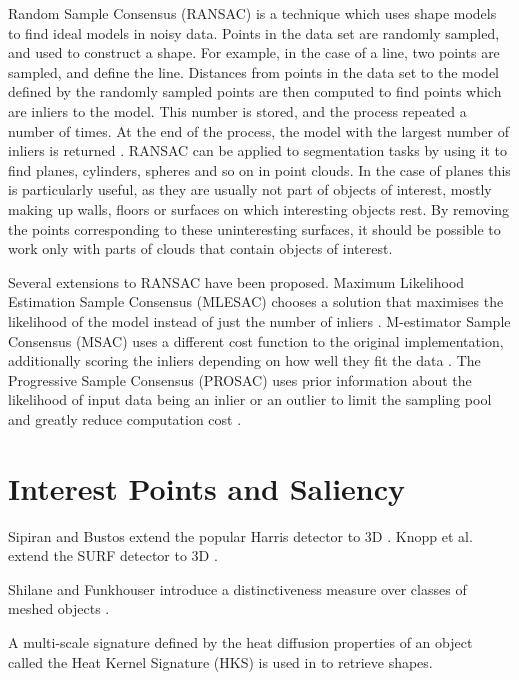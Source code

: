 \documentclass[11pt,a4paper]{kth-mag}
\begin{document}
Random Sample Consensus (RANSAC) is a technique which uses shape models to find
ideal models in noisy data. Points in the data set are randomly sampled, and
used to construct a shape. For example, in the case of a line, two points are
sampled, and define the line. Distances from points in the data set to the model
defined by the randomly sampled points are then computed to find points which
are inliers to the model. This number is stored, and the process repeated a
number of times. At the end of the process, the model with the largest number of
inliers is returned \cite{fischler1981random}. RANSAC can be applied to
segmentation tasks by using it to find planes, cylinders, spheres and so on in
point clouds. In the case of planes this is particularly useful, as they are
usually not part of objects of interest, mostly making up walls, floors or
surfaces on which interesting objects rest. By removing the points corresponding
to these uninteresting surfaces, it should be possible to work only with parts
of clouds that contain objects of interest.

Several extensions to RANSAC have been proposed. Maximum Likelihood Estimation
Sample Consensus (MLESAC) chooses a solution that maximises the likelihood of
the model instead of just the number of inliers \cite{torr2000mlesac}.
M-estimator Sample Consensus (MSAC) uses a different cost function to the
original implementation, additionally scoring the inliers depending on how well
they fit the data \cite{torr2000mlesac}. The Progressive Sample Consensus
(PROSAC) uses prior information about the likelihood of input data being an
inlier or an outlier to limit the sampling pool and greatly reduce computation
cost \cite{chum2005matching}.


\section{Interest Points and Saliency}
Sipiran and Bustos extend the popular Harris detector \cite{harris1988combined}
to 3D \cite{sipiran2011harris}. Knopp et al. extend the SURF detector to 3D
\cite{knopp2010hough}.

Shilane and Funkhouser introduce a distinctiveness measure over classes of
meshed objects \cite{shilane2007distinctive}.

A multi-scale signature defined by the heat diffusion properties of an object
called the Heat Kernel Signature (HKS) \cite{sun2009concise} is used in
\cite{ovsjanikov2009shape} to retrieve shapes.
\end{document}
